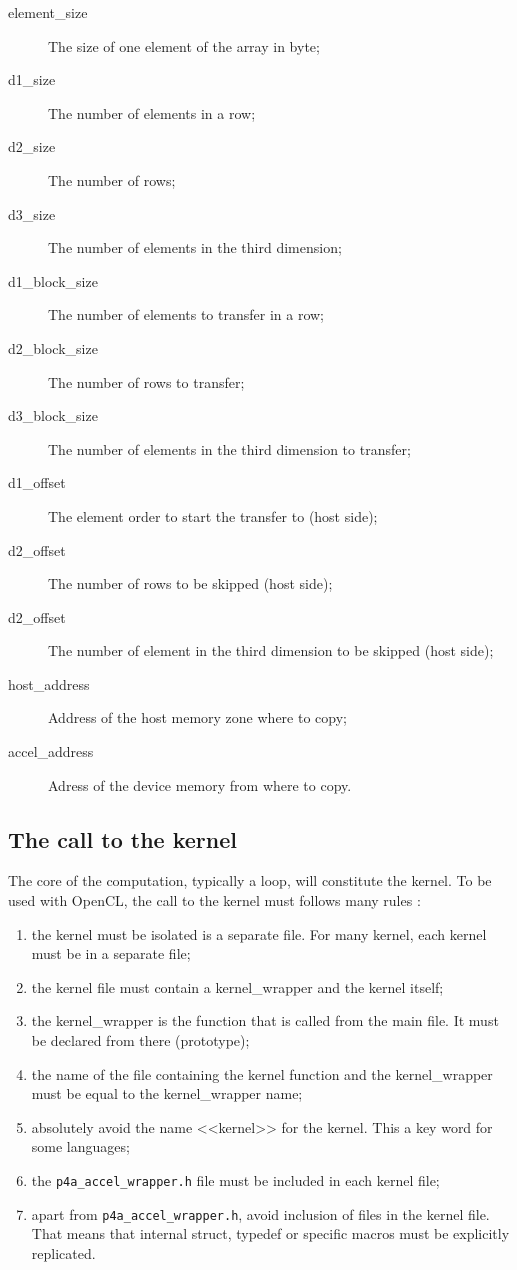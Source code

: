 \documentclass[a4paper]{article}
\begin{document}
\begin{description}
  \begin{description}
  \item[element\_size] The size of one element of the array in byte;
  \item[d1\_size] The number of elements in a row;
  \item[d2\_size] The number of rows;
  \item[d3\_size] The number of elements in the third dimension;
  \item[d1\_block\_size] The number of elements to transfer in a row;
  \item[d2\_block\_size] The number of rows to transfer;
  \item[d3\_block\_size] The number of elements in the third dimension
    to transfer;
  \item[d1\_offset] The element order to start the transfer to (host
    side);
  \item[d2\_offset] The number of rows to be skipped (host side);
  \item[d2\_offset] The number of element in the third dimension to be
    skipped (host side);
  \item[host\_address] Address of the host memory zone where to copy;
  \item[accel\_address] Adress of the device memory from where to copy.
  \end{description}

\end{description}

\subsection{The call to the kernel}

The core of the computation, typically a loop, will constitute the
kernel.  To be used with OpenCL, the call to the kernel must follows
many rules :

\begin{enumerate}
\item the kernel must be isolated is a separate file. For many kernel,
  each kernel must be in a separate file;
\item the kernel file must contain a kernel\_wrapper and the kernel itself;
\item the kernel\_wrapper is the function that is called from the main
  file. It must be declared from there (prototype);
\item the name of the file containing the kernel function and the
  kernel\_wrapper must be equal to the kernel\_wrapper name;
\item absolutely avoid the name <<kernel>> for the kernel. This a key
  word for some languages;
\item the \texttt{p4a\_accel\_wrapper.h} file must be included in each
  kernel file;
\item apart from \texttt{p4a\_accel\_wrapper.h}, avoid inclusion of files
  in the kernel file. That means that internal struct, typedef or
  specific macros must be explicitly replicated.
\end{enumerate}
\end{document}
